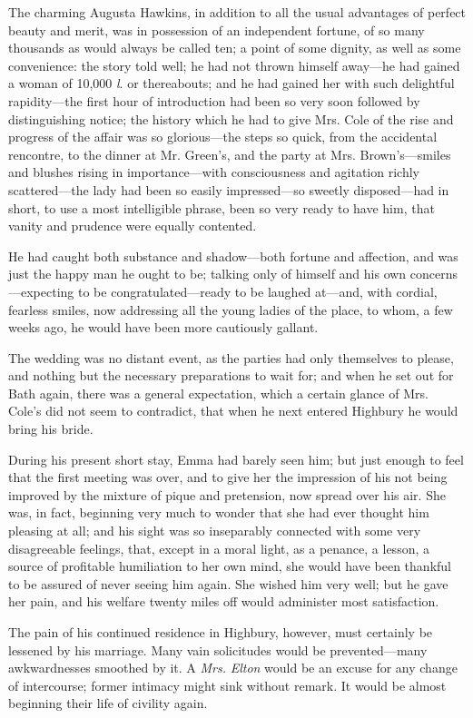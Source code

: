 The charming Augusta Hawkins, in addition to all the usual advantages of perfect beauty and merit, was in possession of an independent fortune, of so many thousands as would always be called ten; a point of some dignity, as well as some convenience: the story told well; he had not thrown himself away---he had gained a woman of 10,000 {\em l}. or thereabouts; and he had gained her with such delightful rapidity---the first hour of introduction had been so very soon followed by distinguishing notice; the history which he had to give Mrs. Cole of the rise and progress of the affair was so glorious---the steps so quick, from the accidental rencontre, to the dinner at Mr. Green's, and the party at Mrs. Brown's---smiles and blushes rising in importance---with consciousness and agitation richly scattered---the lady had been so easily impressed---so sweetly disposed---had in short, to use a most intelligible phrase, been so very ready to have him, that vanity and prudence were equally contented.

He had caught both substance and shadow---both fortune and affection, and was just the happy man he ought to be; talking only of himself and his own concerns---expecting to be congratulated---ready to be laughed at---and, with cordial, fearless smiles, now addressing all the young ladies of the place, to whom, a few weeks ago, he would have been more cautiously gallant.

The wedding was no distant event, as the parties had only themselves to please, and nothing but the necessary preparations to wait for; and when he set out for Bath again, there was a general expectation, which a certain glance of Mrs. Cole's did not seem to contradict, that when he next entered Highbury he would bring his bride.

During his present short stay, Emma had barely seen him; but just enough to feel that the first meeting was over, and to give her the impression of his not being improved by the mixture of pique and pretension, now spread over his air. She was, in fact, beginning very much to wonder that she had ever thought him pleasing at all; and his sight was so inseparably connected with some very disagreeable feelings, that, except in a moral light, as a penance, a lesson, a source of profitable humiliation to her own mind, she would have been thankful to be assured of never seeing him again. She wished him very well; but he gave her pain, and his welfare twenty miles off would administer most satisfaction.

The pain of his continued residence in Highbury, however, must certainly be lessened by his marriage. Many vain solicitudes would be prevented---many awkwardnesses smoothed by it. A {\em Mrs.} {\em Elton} would be an excuse for any change of intercourse; former intimacy might sink without remark. It would be almost beginning their life of civility again.

